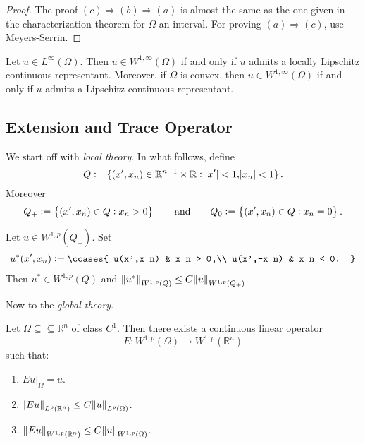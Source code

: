 \begin{proof}
	The proof $(c)\Rightarrow(b)\Rightarrow(a)$ is almost the same as the one given in the characterization theorem for $\Omega$ an interval. For proving $(a)\Rightarrow(c)$, use Meyers-Serrin.
\end{proof}

\begin{corollary}
	Let $u \in L^\infty(\Omega)$. Then $u \in W^{1,\infty}(\Omega)$ if and only if $u$ admits a locally Lipschitz continuous representant. Moreover, if $\Omega$ is convex, then $u \in W^{1,\infty}(\Omega)$ if and only if $u$ admits a Lipschitz continuous representant. 
\end{corollary}

\subsection*{Extension and Trace Operator}

We start off with \emph{local theory}. In what follows, define
\begin{equation*}
	Q := \cbr[0]{(x',x_n) \in \mathbb{R}^{n - 1} \times \mathbb{R} : \abs[0]{x'} < 1, \abs{x_n} < 1}.
\end{equation*}
\noindent Moreover
\begin{equation*}
	Q_+ := \cbr{(x',x_n) \in Q : x_n > 0} \qquad \text{and} \qquad Q_0 := \cbr{(x',x_n) \in Q : x_n = 0}.
\end{equation*}

\begin{lemma}
	Let $u \in W^{1,p}(Q_+)$. Set
	\begin{align*}
		u^*(x',x_n) := \ccases{
			u(x',x_n) & x_n > 0,\\
			u(x',-x_n) & x_n < 0.
		}
	\end{align*}
	Then $u^* \in W^{1,p}(Q)$ and $\norm[0]{u^*}_{W^{1,p}(Q)} \leq C \norm{u}_{W^{1,p}(Q_+)}$.
\end{lemma}

Now to the \emph{global theory}.

\begin{theorem}[Extension]
	Let $\Omega \subseteq\subseteq \mathbb{R}^n$ of class $C^1$. Then there exists a continuous linear operator
	\begin{equation*}
		E : W^{1,p}(\Omega) \to W^{1,p}(\mathbb{R}^n)
	\end{equation*}
	\noindent such that:
	\begin{enumerate}[label = \textup{(}\roman*\textup{)},wide = 0pt]
		\item $Eu\vert_\Omega = u$.
		\item $\norm{Eu}_{L^p(\mathbb{R}^n)} \leq C \norm{u}_{L^p(\Omega)}$.
		\item $\norm[0]{Eu}_{W^{1,p}(\mathbb{R}^n)} \leq C\norm{u}_{W^{1,p}(\Omega)}$.
	\end{enumerate}
\end{theorem}

